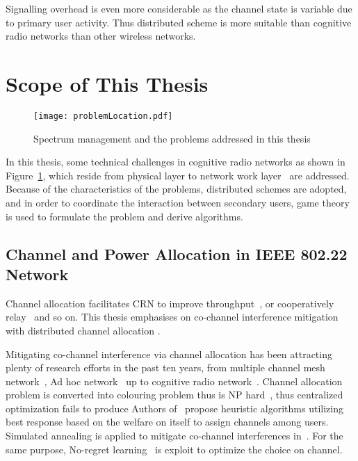 Signalling overhead is even more considerable as the channel state is variable due to primary user activity.
Thus distributed scheme is more suitable than cognitive radio networks than other wireless networks.



\section{Scope of This Thesis}

\begin{figure}[h!]
  \centering
  \texttt{[image: problemLocation.pdf]}
  \caption{Spectrum management and the problems addressed in this thesis}
\label{problemLocation}
\end{figure}

In this thesis, some technical challenges in cognitive radio networks as shown in Figure~\ref{problemLocation}, which reside from physical layer to network work layer~\cite{osi} are addressed. 
Because of the characteristics of the problems, distributed schemes are adopted, and in order to coordinate the interaction between secondary users, game theory is used to formulate the problem and derive algorithms.

\subsection{Channel and Power Allocation in IEEE 802.22 Network}

Channel allocation facilitates CRN to improve throughput~\cite{channelAllocation_throughput_12wcnc}, or cooperatively relay~\cite{channelAllocation_relay_2010ICASSP} and so on.
This thesis emphasises on co-channel interference mitigation with distributed channel allocation . 

Mitigating co-channel interference via channel allocation has been attracting plenty of research efforts in the past ten years, from multiple channel mesh network~\cite{Hyacinth}, Ad hoc network~\cite{Babadi08, Ko_DistributedCA} up to cognitive radio network~\cite{SA_CA_TVWS_2012crowncom,qlearning_huang}. 
Channel allocation problem is converted into colouring problem thus is NP hard~\cite{Hyacinth}, thus centralized optimization fails to produce
Authors of~\cite{Babadi08, Ko_DistributedCA} propose heuristic algorithms utilizing best response based on the welfare on itself to assign channels among users.
Simulated annealing is applied to mitigate co-channel interferences in~\cite{SA_CA_TVWS_2012crowncom}.
For the same purpose, No-regret learning~\cite{qlearning_huang, hart00correlatedeq} is exploit to optimize the choice on channel.


